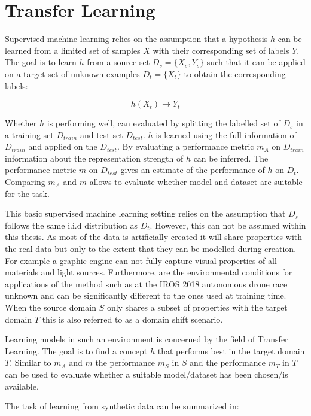 \chapter{Transfer Learning}
\label{sec:training}

Supervised machine learning relies on the assumption that a hypothesis $h$ can be learned from a limited set of samples $X$ with their corresponding set of labels $Y$. The goal is to learn $h$ from a source set $D_s = \{X_{s},Y_{s}\}$ such that it can be applied on a target set of unknown examples $D_t = \{X_{t}\}$ to obtain the corresponding labels:

$$
h(X_t)\rightarrow Y_t
$$ 

Whether $h$ is performing well, can evaluated by splitting the labelled set of $D_s$ in a training set $D_{train}$ and test set $D_{test}$. $h$ is learned using the full information of $D_{train}$ and applied on the $D_{test}$. By evaluating a performance metric $m_A$ on $D_{train}$ information about the representation strength of $h$ can be inferred. The performance metric $m$ on $D_{test}$ gives an estimate of the performance of $h$ on $D_t$. Comparing $m_A$ and $m$ allows to evaluate whether model and dataset are suitable for the task.
			
This basic supervised machine learning setting relies on the assumption that $D_s$ follows the same i.i.d distribution as $D_t$. However, this can not be assumed within this thesis. As most of the data is artificially created it will share properties with the real data but only to the extent that they can be modelled during creation. For example a graphic engine can not fully capture visual properties of all materials and light sources. Furthermore, are the environmental conditions for applications of the method such as at the IROS 2018 autonomous drone race unknown and can be significantly different to the ones used at training time. When the source domain $S$ only shares a subset of properties with the target domain $T$ this is also referred to as a domain shift scenario.

Learning models in such an environment is concerned by the field of Transfer Learning. The goal is to find a concept $h$ that performs best in the target domain $T$. Similar to $m_A$ and $m$ the performance $m_S$ in $S$ and the performance $m_T$ in $T$ can be used to evaluate whether a suitable model/dataset has been chosen/is available.

The task of learning from synthetic data can be summarized in:

